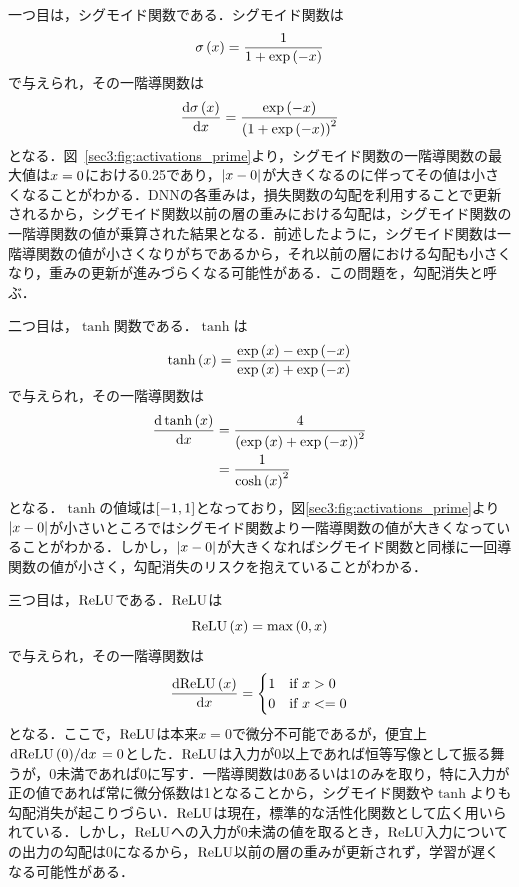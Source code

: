 一つ目は，シグモイド関数である．シグモイド関数は
\begin{equation}
    \sigma\left(x\right) = \frac{1}{1 + \exp\left(-x\right)}
\end{equation}
で与えられ，その一階導関数は
\begin{equation}
    \dv{\sigma\left(x\right)}{x} = \frac{\exp\left(-x\right)}{\left(1 + \exp\left(-x\right)\right)^{2}}
\end{equation}
となる．図~\ref{sec3:fig:activations_prime}より，シグモイド関数の一階導関数の最大値は$x=0$における0.25であり，$\left|x - 0\right|$が大きくなるのに伴ってその値は小さくなることがわかる．DNNの各重みは，損失関数の勾配を利用することで更新されるから，シグモイド関数以前の層の重みにおける勾配は，シグモイド関数の一階導関数の値が乗算された結果となる．前述したように，シグモイド関数は一階導関数の値が小さくなりがちであるから，それ以前の層における勾配も小さくなり，重みの更新が進みづらくなる可能性がある．この問題を，勾配消失と呼ぶ．

二つ目は，$\tanh$関数である．$\tanh$は
\begin{equation}
    \tanh\left(x\right) = \frac{\exp\left(x\right) - \exp\left(-x\right)}{\exp\left(x\right) + \exp\left(-x\right)}
\end{equation}
で与えられ，その一階導関数は
\begin{align}
    \dv{\tanh\left(x\right)}{x} & = \frac{4}{\left(\exp\left(x\right) + \exp\left(-x\right)\right)^{2}} \\
                                  & = \frac{1}{\cosh\left(x\right)^{2}}
\end{align}
となる．$\tanh$の値域は$\left[-1, 1\right]$となっており，図\ref{sec3:fig:activations_prime}より$\left|x - 0\right|$が小さいところではシグモイド関数より一階導関数の値が大きくなっていることがわかる．しかし，$\left|x - 0\right|$が大きくなればシグモイド関数と同様に一回導関数の値が小さく，勾配消失のリスクを抱えていることがわかる．

三つ目は，$\text{ReLU}$である．$\text{ReLU}$は
\begin{equation}
    \text{ReLU}\left(x\right) = \max \left(0, x\right)
\end{equation}
で与えられ，その一階導関数は
\begin{equation}
    \dv{\text{ReLU}\left(x\right)}{x} =
    \begin{cases}
        1 & \text{if $x > 0$}  \\
        0 & \text{if $x <= 0$}
    \end{cases}
\end{equation}
となる．ここで，$\text{ReLU}$は本来$x = 0$で微分不可能であるが，便宜上$\dv*{\text{ReLU}\left(0\right)}{x} = 0$とした．$\text{ReLU}$は入力が0以上であれば恒等写像として振る舞うが，0未満であれば0に写す．一階導関数は0あるいは1のみを取り，特に入力が正の値であれば常に微分係数は1となることから，シグモイド関数や$\tanh$よりも勾配消失が起こりづらい．$\text{ReLU}$は現在，標準的な活性化関数として広く用いられている．しかし，$\text{ReLU}$への入力が0未満の値を取るとき，$\text{ReLU}$入力についての出力の勾配は0になるから，$\text{ReLU}$以前の層の重みが更新されず，学習が遅くなる可能性がある．

